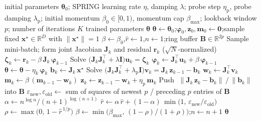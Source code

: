 \documentclass[11pt]{article}
\begin{document}
\begin{algorithm}[t]
\caption{Same-Sampled SPRING}
\label{alg:same-sampled-spring}
\begin{algorithmic}[1]
  \Require initial parameters $\bm\theta_0$;
           SPRING learning rate $\eta$, damping $\lambda$;
           probe step $\eta_{\mathrm p}$, probe damping $\lambda_{\mathrm p}$;
           initial momentum $\beta_0 \in [0,1)$, momentum cap $\beta_{\max}$;
           lookback window $p$;
           number of iterations $K$
  \Ensure trained parameters $\bm\theta$
  \State $\bm\theta \gets \bm\theta_0$;\enspace $\bm\varphi_0,\bm z_0,\bm m_0 \gets \bm 0$;\enspace sample fixed $\bm x^\star \in \mathbb{R}^D$ with $\lVert \bm x^\star \rVert = 1$
  \State $\beta \gets \beta_0$,\enspace $\hat r \gets 1$,\enspace $n \gets 1$;\enspace ring buffer $\bm B \in \mathbb{R}^{2p}$
    \State Sample mini-batch; form joint Jacobian $\bm J_k$ and residual $\bm r_k$ ($\sqrt{N}$-normalized)
    \State $\bm\zeta_k \gets \bm r_k - \beta\, \bm J_k\, \bm\varphi_{k-1}$
    \State Solve $\bigl(\bm J_k \bm J_k^{\!\top} + \lambda \bm I\bigr)\bm u_k = \bm\zeta_k$
    \State $\bm\varphi_k \gets \bm J_k^{\!\top}\bm u_k + \beta\, \bm\varphi_{k-1}$
    \State $\bm\theta \gets \bm\theta - \eta_k\, \bm\varphi_k$
    \State $\bm b_k \gets \bm J_k\, \bm x^\star$
    \State Solve $\bigl(\bm J_k \bm J_k^{\!\top} + \lambda_{\mathrm p} \bm I\bigr)\bm v_k = \bm J_k\, \bm z_{k-1} - \bm b_k$
    \State $\bm w_k \gets \bm J_k^{\!\top}\bm v_k$
    \State $\bm m_k \gets \beta\,(\bm m_{k-1} - \bm w_k)$
    \State $\bm z_k \gets \bm z_{k-1} - \bm w_k + \eta_{\mathrm p}\, \bm m_k$
    \State Push $\;\lVert \bm J_k\, \bm z_k - \bm b_k\rVert \,/\, \lVert \bm b_k\rVert\;$ into $\bm B$
      \State $\varepsilon_{\mathrm{new}}, \varepsilon_{\mathrm{old}} \gets$ sum of squares of newest $p$ / preceding $p$ entries of $\bm B$
      \State $\alpha \gets n^{\log n} / (n+1)^{\log(n+1)}$
      \State $\hat r \gets \alpha\,\hat r + (1-\alpha)\,\min\!\bigl(1,\, \varepsilon_{\mathrm{new}}/\varepsilon_{\mathrm{old}}\bigr)$
      \State $\rho \gets \max\!\bigl(0,\, 1 - \hat r^{\,1/p}\bigr)$
      \State $\beta \gets \min\!\bigl(\beta_{\max},\, (1-\rho)/(1+\rho)\bigr)$;\enspace $n \gets n+1$
    \EndIf
  \EndFor
  \State \Return $\bm\theta$
\end{algorithmic}
\end{algorithm}
\end{document}

